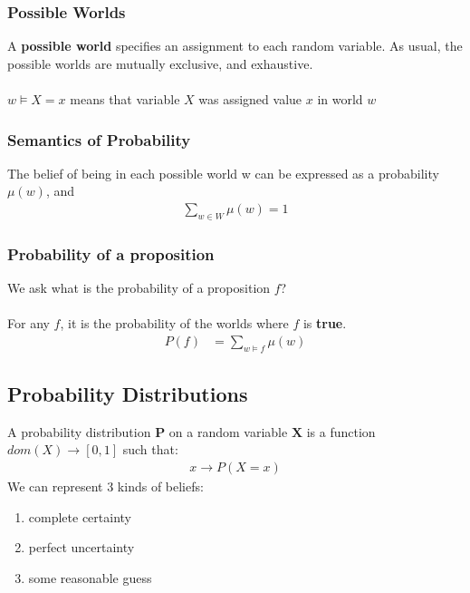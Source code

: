 \documentclass{article}
\def\blu#1{{\color{blu}#1}}
\def\gre#1{{\color{gre}#1}}
\begin{document}
\subsubsection*{Possible Worlds}
A \blu{\textbf{possible world }}specifies an assignment to each random variable. As usual, the possible worlds are mutually \gre{exclusive}, and \gre{exhaustive}. \\
\\
$ w \vDash X = x $ means that variable $ X $ was assigned value $ x $ in world $ w $

\subsubsection*{Semantics of Probability}
The belief of being in each possible world w can be expressed as a probability $ \mu(w) $, and 
\begin{align*}
\sum_{w \in W} \mu(w) = 1
\end{align*}

\subsubsection*{Probability of a proposition}
We ask what is the probability of a proposition $ f $?\\
\\
For any $ f $, it is the probability of the worlds where $ f $ is \textbf{\blu{true}}. 
\begin{align*}
P(f) &= \sum_{w \vDash f}\mu (w)
\end{align*}

\subsection*{Probability Distributions}
A probability distribution $ \mathbf{P} $ on a random variable $ \mathbf{X} $ is a function $ dom(X) \rightarrow [0, 1] $ such that:
\begin{align*}
x \rightarrow P(X = x)
\end{align*}
We can represent 3 kinds of beliefs:
\begin{enumerate}
	\item complete certainty
	\item perfect uncertainty
	\item some reasonable guess
\end{enumerate}
\end{document}
